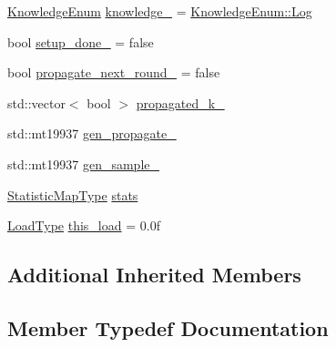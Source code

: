 \begin{DoxyCompactItemize}
\item 
\hyperlink{namespacevt_1_1vrt_1_1collection_1_1lb_a72b44c7e6b2052509331d57b9c94c84a}{Knowledge\+Enum} \hyperlink{structvt_1_1vrt_1_1collection_1_1lb_1_1_tempered_l_b_a4b6087104debbccb5396cb96a599767f}{knowledge\+\_\+} = \hyperlink{namespacevt_1_1vrt_1_1collection_1_1lb_a72b44c7e6b2052509331d57b9c94c84aace0be71e33226e4c1db2bcea5959f16b}{Knowledge\+Enum\+::\+Log}
\item 
bool \hyperlink{structvt_1_1vrt_1_1collection_1_1lb_1_1_tempered_l_b_a79d43538cf3aa0958351404db0753050}{setup\+\_\+done\+\_\+} = false
\item 
bool \hyperlink{structvt_1_1vrt_1_1collection_1_1lb_1_1_tempered_l_b_a64d34e82497889a4d3277f0cb79aa7e1}{propagate\+\_\+next\+\_\+round\+\_\+} = false
\item 
std\+::vector$<$ bool $>$ \hyperlink{structvt_1_1vrt_1_1collection_1_1lb_1_1_tempered_l_b_aed0424ef21a6f06193eaf0f247215836}{propagated\+\_\+k\+\_\+}
\item 
std\+::mt19937 \hyperlink{structvt_1_1vrt_1_1collection_1_1lb_1_1_tempered_l_b_a449632c461159209add8e135b30f3d4f}{gen\+\_\+propagate\+\_\+}
\item 
std\+::mt19937 \hyperlink{structvt_1_1vrt_1_1collection_1_1lb_1_1_tempered_l_b_a714777ab4aebef961c51e38cac9477af}{gen\+\_\+sample\+\_\+}
\item 
\hyperlink{structvt_1_1vrt_1_1collection_1_1lb_1_1_base_l_b_acd9bdad961ac83c96b7a227de672f96c}{Statistic\+Map\+Type} \hyperlink{structvt_1_1vrt_1_1collection_1_1lb_1_1_tempered_l_b_afa55e2bd7b0bbc336dd66daeb155d09c}{stats}
\item 
\hyperlink{namespacevt_a8fb51741340b87d7aaee0bef60e9896b}{Load\+Type} \hyperlink{structvt_1_1vrt_1_1collection_1_1lb_1_1_tempered_l_b_a07e1e0f447bf9ccbb4637c3212fab2c5}{this\+\_\+load} = 0.\+0f
\end{DoxyCompactItemize}
\subsection*{Additional Inherited Members}


\subsection{Member Typedef Documentation}
\mbox{\label{structvt_1_1vrt_1_1collection_1_1lb_1_1_tempered_l_b_a38d9ad7e92612cdbdf564b6f49b516a7}} 
